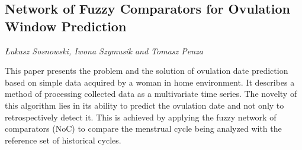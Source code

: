 \documentclass[../booklet.tex]{subfiles}
\begin{document}
\subsection[Network of Fuzzy Comparators for Ovulation Window Prediction. {\it Łukasz Sosnowski, Iwona Szymusik and Tomasz Penza}]{Network of Fuzzy Comparators for Ovulation Window Prediction}
  

\begin{center}
  {\it Łukasz Sosnowski, Iwona Szymusik and Tomasz Penza}
\end{center}

\vskip 0.8cm


This paper presents the problem and the solution of ovulation date prediction based on simple data acquired by a woman in home environment. It describes a method of processing collected data as a multivariate time series. The novelty of this algorithm lies in its ability to predict the ovulation date and not only to retrospectively detect it. This is achieved by applying the fuzzy network of comparators (NoC) to compare the menstrual cycle being analyzed with the reference set of historical cycles. 
\end{document}
